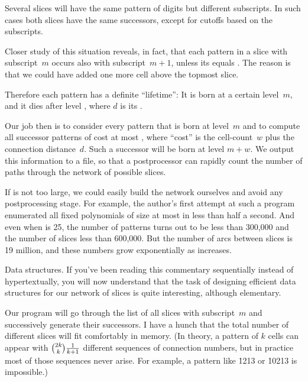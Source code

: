 \fi

Several slices will have the same pattern of digits but different
subscripts. In such cases both slices have the same successors, except for
cutoffs based on the subscripts.

Closer study of this situation reveals, in fact, that each pattern in a slice
with subscript~$m$ occurs also with subscript~$m+1$, unless its
 equals . The reason is that we could
have added one
more cell above the topmost slice.

Therefore each pattern has a definite ``lifetime'': It is born at a certain
level~$m$, and it dies after level , where $d$ is its
.

Our job then is to consider every pattern that is born at level~$m$ and to
compute all successor patterns of cost at most , where
``cost'' is the
cell-count~$w$ plus the connection distance~$d$. Such a successor will be born
at level $m+w$. We output this information to a file, so that a postprocessor
can rapidly count the number of paths through the network of possible slices.

If  is not too large, we could easily build the network ourselves
and
avoid any postprocessing stage. For example, the author's first attempt at
such a program enumerated all fixed polynomials of size at most 
in less than half a second. And even when  is 25, the
number of patterns turns out to be less than 300,000 and the number of
slices less than 600,000. But the number of arcs between slices is
19 million, and these numbers grow exponentially as  increases.

\fi

Data structures. If you've been reading this commentary sequentially
instead
of hypertextually, you will now understand that the task of designing
efficient data structures for our network of slices is
quite interesting, although elementary.

Our program will go through the list of all slices with subscript~$m$ and
successively generate their successors. I have a hunch that the total number
of different slices will fit comfortably in memory. (In theory, a pattern
of $k$ cells can appear with ${2k\choose k}{1\over k+1}$ different sequences
of connection numbers, but in practice most of those sequences never arise. For
example, a pattern like \.{1213} or \.{10213} is impossible.)

